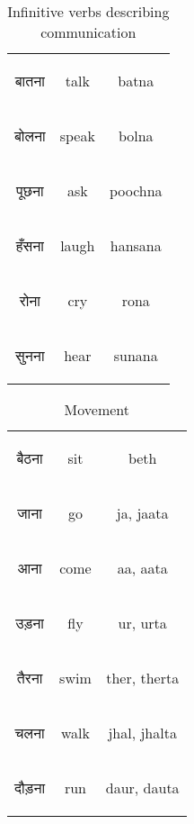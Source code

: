 \begin{table}[H]
    \centering
    \begin{tabular}{c|c|c}
        \begin{hindi} बातना \end{hindi} & talk & batna \\
        \begin{hindi} बोलना \end{hindi} & speak & bolna \\
        \begin{hindi} पूछना \end{hindi} & ask & poochna \\
        \begin{hindi} हँसना \end{hindi} & laugh & hansana \\
        \begin{hindi} रोना \end{hindi} & cry & rona \\
        \begin{hindi} सुनना \end{hindi} & hear & sunana	 \\
    \end{tabular}
    \caption{Infinitive verbs describing communication}
    \label{tab:verbs_communication}
\end{table}


\begin{table}[H]
    \centering
    \begin{tabular}{c|c|c}
     \begin{hindi} बैठना  \end{hindi} & sit & beth \\
     \begin{hindi} जाना \end{hindi} & go & ja, jaata \\
     \begin{hindi} आना \end{hindi} & come & aa, aata \\
     \begin{hindi} उड़ना \end{hindi} & fly & ur, urta \\
     \begin{hindi} तैरना \end{hindi} & swim & ther, therta \\
     \begin{hindi} चलना \end{hindi} & walk & jhal, jhalta \\
     \begin{hindi} दौड़ना \end{hindi} & run & daur, dauta \\
    \end{tabular}
    \caption{Movement}
    \label{tab:verbs_move}
\end{table}



